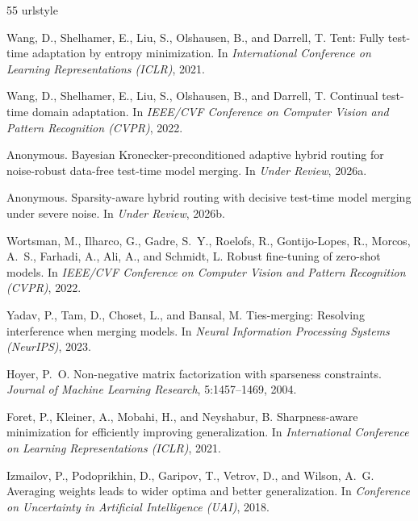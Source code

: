 \documentclass{article}
\theoremstyle{plain}
\theoremstyle{definition}
\theoremstyle{remark}
\begin{document}
\begin{thebibliography}{55}
\providecommand{\natexlab}[1]{#1}
\providecommand{\url}[1]{\texttt{#1}}
\expandafter\ifx\csname urlstyle\endcsname\relax
  \providecommand{\doi}[1]{doi: #1}\else
  \providecommand{\doi}{doi: \begingroup \urlstyle{rm}\Url}\fi

Wang, D., Shelhamer, E., Liu, S., Olshausen, B., and Darrell, T.
\newblock Tent: Fully test-time adaptation by entropy minimization.
\newblock In \emph{International Conference on Learning Representations (ICLR)}, 2021.

Wang, D., Shelhamer, E., Liu, S., Olshausen, B., and Darrell, T.
\newblock Continual test-time domain adaptation.
\newblock In \emph{IEEE/CVF Conference on Computer Vision and Pattern Recognition (CVPR)}, 2022.

Anonymous.
\newblock Bayesian Kronecker-preconditioned adaptive hybrid routing for noise-robust data-free test-time model merging.
\newblock In \emph{Under Review}, 2026a.

Anonymous.
\newblock Sparsity-aware hybrid routing with decisive test-time model merging under severe noise.
\newblock In \emph{Under Review}, 2026b.

Wortsman, M., Ilharco, G., Gadre, S.~Y., Roelofs, R., Gontijo-Lopes, R., Morcos, A.~S., Farhadi, A., Ali, A., and Schmidt, L.
\newblock Robust fine-tuning of zero-shot models.
\newblock In \emph{IEEE/CVF Conference on Computer Vision and Pattern Recognition (CVPR)}, 2022.

Yadav, P., Tam, D., Choset, L., and Bansal, M.
\newblock Ties-merging: Resolving interference when merging models.
\newblock In \emph{Neural Information Processing Systems (NeurIPS)}, 2023.

Hoyer, P.~O.
\newblock Non-negative matrix factorization with sparseness constraints.
\newblock \emph{Journal of Machine Learning Research}, 5:1457--1469, 2004.

Foret, P., Kleiner, A., Mobahi, H., and Neyshabur, B.
\newblock Sharpness-aware minimization for efficiently improving generalization.
\newblock In \emph{International Conference on Learning Representations (ICLR)}, 2021.

Izmailov, P., Podoprikhin, D., Garipov, T., Vetrov, D., and Wilson, A.~G.
\newblock Averaging weights leads to wider optima and better generalization.
\newblock In \emph{Conference on Uncertainty in Artificial Intelligence (UAI)}, 2018.


\end{thebibliography}
\end{document}
